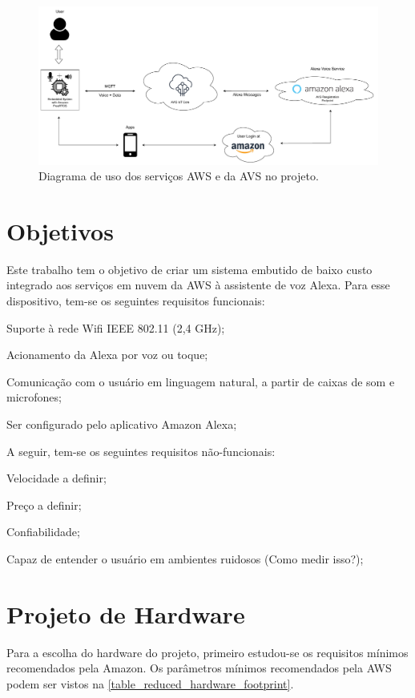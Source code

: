 \documentclass[
    12pt,
    openright,
    twoside,
    a4paper,
    english,
    spanish,
    brazil,
    ]{abntex2}
\begin{document}
\begin{figure}[htb]
	\begin{center}
		\caption{Diagrama de uso dos serviços AWS e da AVS no projeto.}\label{fig_project_diagram}
		\includegraphics[scale=0.4]{Images/project_diagram.pdf}
	\end{center}
\end{figure}

\section{Objetivos}
Este trabalho tem o objetivo de criar um sistema embutido de baixo custo integrado aos serviços em nuvem da AWS à assistente de voz Alexa. Para esse dispositivo, tem-se os seguintes requisitos funcionais:
\begin{alineas}
	\item Suporte à rede Wifi IEEE 802.11 (2,4 GHz);
	\item Acionamento da Alexa por voz ou toque;
	\item Comunicação com o usuário em linguagem natural, a partir de caixas de som e microfones;
	\item Ser configurado pelo aplicativo Amazon Alexa;
\end{alineas}

A seguir, tem-se os seguintes requisitos não-funcionais:
\begin{alineas}
	\item Velocidade a definir;
	\item Preço a definir;
	\item Confiabilidade;
	\item Capaz de entender o usuário em ambientes ruidosos (Como medir isso?);
\end{alineas}

\section{Projeto de Hardware}
Para a escolha do hardware do projeto, primeiro estudou-se os requisitos mínimos recomendados pela Amazon. Os parâmetros mínimos recomendados pela AWS podem ser vistos na \autoref{table_reduced_hardware_footprint}.
\end{document}

